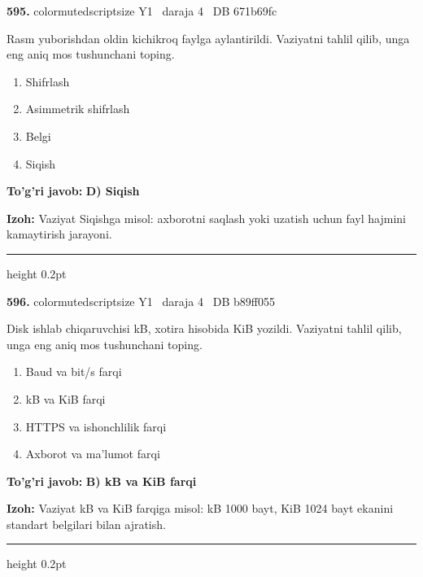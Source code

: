 \documentclass[10pt,a4paper,oneside]{article}
\begin{document}
\noindent\textbf{\color{ink}595.}  {color{muted}scriptsize Y1 \textbullet\ daraja 4 \textbullet\ DB 671b69fc}
\par
Rasm yuborishdan oldin kichikroq faylga aylantirildi. Vaziyatni tahlil qilib, unga eng aniq mos tushunchani toping.
\begin{enumerate}[label=\Alph*),leftmargin=9mm]
\item Shifrlash
\item Asimmetrik shifrlash
\item Belgi
\item Siqish
\end{enumerate}
\begin{tcolorbox}[enhanced,breakable,colback=teal!4,colframe=teal!50!black,boxrule=0.5pt,arc=1.1mm,left=3mm,right=3mm,top=1.7mm,bottom=1.7mm,before skip=2mm,after skip=2mm]
\textbf{\color{teal}To'g'ri javob:} \textbf{D) Siqish}
\par\smallskip
\textbf{Izoh:} Vaziyat Siqishga misol: axborotni saqlash yoki uzatish uchun fayl hajmini kamaytirish jarayoni.
\end{tcolorbox}
\vspace{2mm}\hrule height 0.2pt \vspace{3mm}

\noindent\textbf{\color{ink}596.}  {color{muted}scriptsize Y1 \textbullet\ daraja 4 \textbullet\ DB b89ff055}
\par
Disk ishlab chiqaruvchisi kB, xotira hisobida KiB yozildi. Vaziyatni tahlil qilib, unga eng aniq mos tushunchani toping.
\begin{enumerate}[label=\Alph*),leftmargin=9mm]
\item Baud va bit/s farqi
\item kB va KiB farqi
\item HTTPS va ishonchlilik farqi
\item Axborot va ma'lumot farqi
\end{enumerate}
\begin{tcolorbox}[enhanced,breakable,colback=teal!4,colframe=teal!50!black,boxrule=0.5pt,arc=1.1mm,left=3mm,right=3mm,top=1.7mm,bottom=1.7mm,before skip=2mm,after skip=2mm]
\textbf{\color{teal}To'g'ri javob:} \textbf{B) kB va KiB farqi}
\par\smallskip
\textbf{Izoh:} Vaziyat kB va KiB farqiga misol: kB 1000 bayt, KiB 1024 bayt ekanini standart belgilari bilan ajratish.
\end{tcolorbox}
\vspace{2mm}\hrule height 0.2pt \vspace{3mm}
\end{document}
